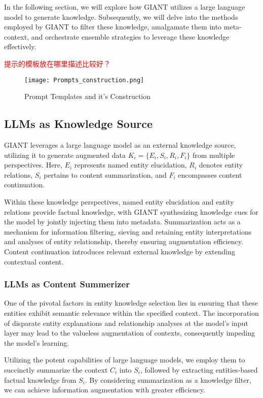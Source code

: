  In the following section, we will explore how GIANT utilizes a large language model to generate knowledge. Subsequently, we will delve into the methods employed by GIANT to filter these knowledge, amalgamate them into meta-context, and orchestrate ensemble strategies to leverage these knowledge effectively.

\textcolor{red}{提示的模板放在哪里描述比较好？}
\label{sec:prompt_construction}
\begin{figure*}[h]
	\centering
	\texttt{[image: Prompts\_construction.png]}
	\caption{Prompt Templates and it's Construction}
	\label{fig:prompt_template}
\end{figure*}   

\subsection{LLMs as Knowledge Source}
\label{sec:llm_as_knowledge_source}
 GIANT leverages a large language model as an external knowledge source, utilizing it to generate augmented data $K_i = \{E_i, S_i, R_i, F_i\}$ from multiple perspectives. Here, $E_i$ represents named entity elucidation, $R_i$ denotes entity relations, $S_i$ pertains to content summarization, and $F_i$ encompasses content continuation.

 Within these knowledge perspectives, named entity elucidation and entity relations provide factual knowledge, with GIANT synthesizing knowledge cues for the model by jointly injecting them into metadata.
 Summarization acts as a mechanism for information filtering, sieving and retaining entity interpretations and analyses of entity relationship, thereby ensuring augmentation efficiency. 
 Content continuation introduces relevant external knowledge by extending contextual content.
 
\subsubsection{LLMs as Content Summerizer}
 One of the pivotal factors in entity knowledge selection lies in ensuring that these entities exhibit semantic relevance within the specified context. The incorporation of disparate entity explanations and relationship analyses at the model's input layer may lead to the valueless augmentation of contexts, consequently impeding the model's learning.
 
 Utilizing the potent capabilities of large language models, we employ them to succinctly summarize the context $C_i$ into $S_i$, followed by extracting entities-based factual knowledge from $S_i$.
 By considering summarization as a knowledge filter, we can achieve information augmentation with greater efficiency.
 

